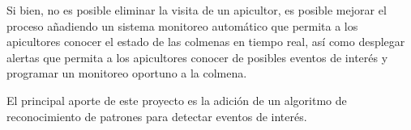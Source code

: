 
Si bien, no es posible eliminar la visita de un apicultor, es posible mejorar el proceso añadiendo un sistema monitoreo automático que permita a los apicultores conocer el estado de las colmenas en tiempo real, así como desplegar alertas que permita a los apicultores conocer de posibles eventos de interés y programar un monitoreo oportuno a la colmena.

El principal aporte de este proyecto es la adición de un algoritmo de reconocimiento de patrones para detectar eventos de interés.
